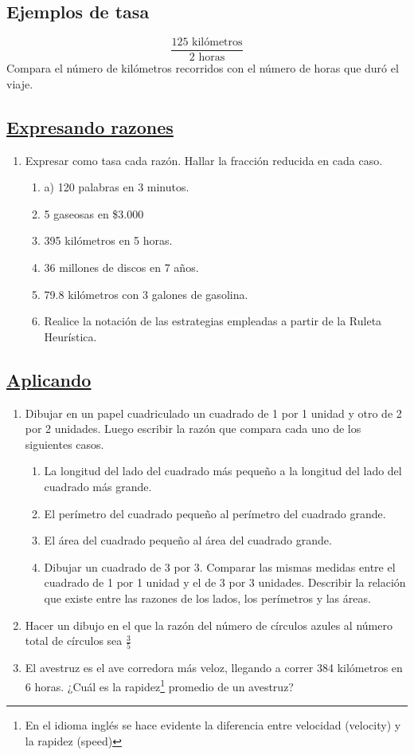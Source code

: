 \documentclass[10pt,twoside]{article}
\begin{document}
\subsection*{Ejemplos de tasa}
\[\dfrac{125\text{ kil\'{o}metros}}{2\text{ horas}}\] Compara el n\'{u}mero de kil\'{o}metros recorridos con el n\'{u}mero de horas que dur\'{o} el viaje.
\subsection*{\underline{Expresando razones}}
\begin{enumerate}
\item Expresar como tasa cada razón. Hallar la fracción reducida en cada caso.
\begin{enumerate}
\item a) 120 palabras en 3 minutos.
\item 5 gaseosas en \$3.000
\item 395 kilómetros en 5 horas.
\item 36 millones de discos en 7 años.
\item 79.8 kilómetros con 3 galones de gasolina.
\item Realice la notación de las estrategias empleadas a partir de la Ruleta Heurística.
\end{enumerate}
\end{enumerate}
\subsection*{\underline{Aplicando}}
\begin{enumerate}
\item Dibujar en un papel cuadriculado un cuadrado de 1 por 1 unidad y otro de 2 por 2 unidades. Luego escribir la razón que compara cada  uno de los siguientes casos.
\begin{enumerate}
\item La longitud del lado del cuadrado más pequeño a la longitud del lado del cuadrado más grande.
\item El perímetro del cuadrado pequeño al perímetro del cuadrado grande.
\item El área del cuadrado pequeño al área del cuadrado grande.
\item Dibujar un cuadrado de 3 por 3. Comparar las mismas medidas entre el cuadrado de 1 por 1 unidad y el de 3 por 3 unidades.  Describir la relación que existe entre las razones de los lados, los perímetros y las áreas.
\end{enumerate}
\item Hacer un dibujo en el que la razón del número de círculos azules al número total de círculos sea $\frac{3}{5}$
\item El avestruz es el ave corredora más veloz, llegando a correr 384 kilómetros en 6 horas. ¿Cuál es la rapidez\footnote{En el idioma inglés se hace evidente la diferencia entre velocidad (velocity) y la rapidez (speed)} promedio de un avestruz?
\end{enumerate}
\end{document}
